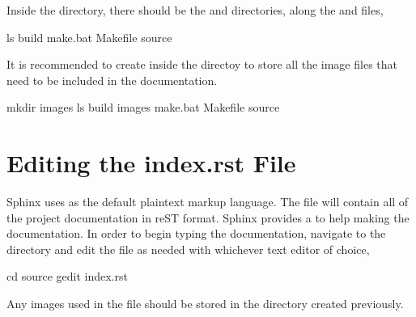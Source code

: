 \documentclass[letterpaper,10pt,english]{sphinxhowto}
\begin{document}
\sphinxAtStartPar
Inside the  directory, there should be the  and  directories, along the  and  files,

\begin{sphinxVerbatim}[commandchars=\\\{\}]
\PYGZdl{} ls
build  make.bat  Makefile  source
\end{sphinxVerbatim}

\sphinxAtStartPar
It is recommended to create inside the  directoy to store all the image files that need to be included in the documentation.

\begin{sphinxVerbatim}[commandchars=\\\{\}]
\PYGZdl{} mkdir images
\PYGZdl{} ls
build  images  make.bat  Makefile  source
\end{sphinxVerbatim}


\section{Editing the index.rst File}
\label{\detokenize{index:editing-the-index-rst-file}}
\sphinxAtStartPar
Sphinx uses  as the default plaintext markup language. The  file will contain all of the project documentation in reST format. Sphinx provides a  to help making the documentation. In order to begin typing the documentation, navigate to the  directory and edit the  file as needed with whichever text editor of choice,

\begin{sphinxVerbatim}[commandchars=\\\{\}]
\PYGZdl{} cd source
\PYGZdl{} gedit index.rst
\end{sphinxVerbatim}

\sphinxAtStartPar
Any images used in the  file should be stored in the  directory created previously.
\end{document}
